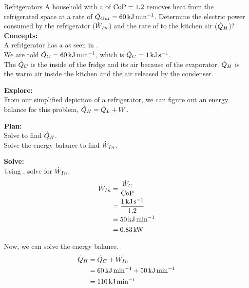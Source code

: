 \begin{example}{Refrigerators}
  A household  with a  of $\text{CoP} = 1.2$ removes heat from the refrigerated space at a rate of $\dot{Q}_{Out} = \SI{60}{\kilo\joule\per\minute}$.
  Determine the electric power consumed by the refrigerator ($\dot{W}_{In}$) and the rate of  to the kitchen air ($\dot{Q}_{H}$)?
  \tcblower{}
  \textbf{Concepts:} \\
  A refrigerator has a  as seen in . \\
  We are told $\dot{Q}_{C} = \SI{60}{\kilo\joule\per\minute}$, which is $\dot{Q}_{C} = \SI{1}{\kilo\joule\per\second}$. \\
  The $\dot{Q}_{C}$ is the inside of the fridge and its air because of the evaporator.
  $\dot{Q}_{H}$ is the warm air inside the kitchen and the air released by the condenser.

  \textbf{Explore:} \\
  From our simplified depiction of a refrigerator, we can figure out an energy balance for this problem, $\dot{Q}_{H} = \dot{Q}_{L} + \dot{W}$.

  \textbf{Plan:} \\
  Solve  to find $\dot{Q}_{H}$. \\
  Solve the energy balance to find $\dot{W}_{In}$.

  \textbf{Solve:} \\
  Using , solve for $\dot{W}_{In}$.
  \begin{align*}
    \dot{W}_{In} &= \frac{\dot{W}_{C}}{\text{CoP}} \\
                          &= \frac{\SI{1}{\kilo\joule\per\second}}{1.2} \\
                          &= \SI{50}{\kilo\joule\per\minute} \\
                          &= \SI{0.83}{\kilo\watt}
  \end{align*}

  Now, we can solve the energy balance.
  \begin{align*}
    \dot{Q}_{H} &= \dot{Q}_{C} + \dot{W}_{In} \\
                         &= \SI{60}{\kilo\joule\per\minute} + \SI{50}{\kilo\joule\per\minute} \\
                         &= \SI{110}{\kilo\joule\per\minute}
  \end{align*}


\end{example}
